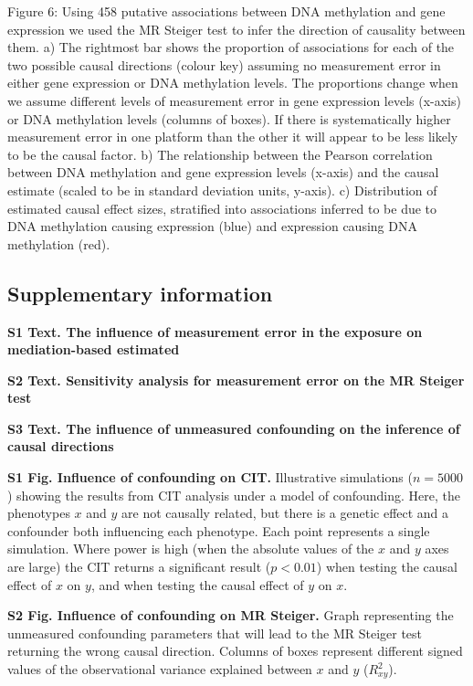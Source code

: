 \documentclass[]{article}
\begin{document}
Figure 6: Using 458 putative associations between DNA methylation and
gene expression we used the MR Steiger test to infer the direction of
causality between them. a) The rightmost bar shows the proportion of
associations for each of the two possible causal directions (colour key)
assuming no measurement error in either gene expression or DNA
methylation levels. The proportions change when we assume different
levels of measurement error in gene expression levels (x-axis) or DNA
methylation levels (columns of boxes). If there is systematically higher
measurement error in one platform than the other it will appear to be
less likely to be the causal factor. b) The relationship between the
Pearson correlation between DNA methylation and gene expression levels
(x-axis) and the causal estimate (scaled to be in standard deviation
units, y-axis). c) Distribution of estimated causal effect sizes,
stratified into associations inferred to be due to DNA methylation
causing expression (blue) and expression causing DNA methylation (red).

\hypertarget{supplementary-information}{%
\subsection{Supplementary information}\label{supplementary-information}}

\textbf{S1 Text. The influence of measurement error in the exposure on
mediation-based estimated}

\textbf{S2 Text. Sensitivity analysis for measurement error on the MR
Steiger test}

\textbf{S3 Text. The influence of unmeasured confounding on the
inference of causal directions}

\textbf{S1 Fig. Influence of confounding on CIT.} Illustrative
simulations (\(n = 5000\)) showing the results from CIT analysis under a
model of confounding. Here, the phenotypes \(x\) and \(y\) are not
causally related, but there is a genetic effect and a confounder both
influencing each phenotype. Each point represents a single simulation.
Where power is high (when the absolute values of the \(x\) and \(y\)
axes are large) the CIT returns a significant result (\(p < 0.01\)) when
testing the causal effect of \(x\) on \(y\), and when testing the causal
effect of \(y\) on \(x\).

\textbf{S2 Fig. Influence of confounding on MR Steiger.} Graph
representing the unmeasured confounding parameters that will lead to the
MR Steiger test returning the wrong causal direction. Columns of boxes
represent different signed values of the observational variance
explained between \(x\) and \(y\) (\(R^2_{xy}\)).
\end{document}
